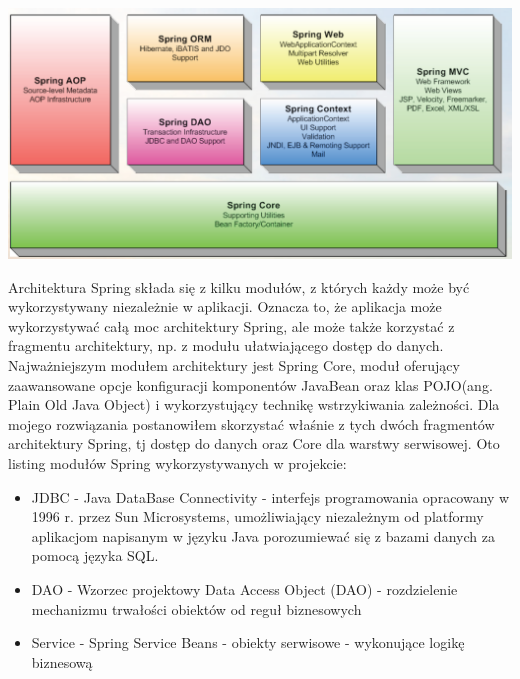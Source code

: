 \includegraphics[scale=0.31]{images/spring-modules}

Architektura Spring składa się z kilku modułów, z których każdy może być wykorzystywany niezależnie w aplikacji. Oznacza to, że aplikacja może wykorzystywać całą moc architektury Spring, ale może także korzystać z fragmentu architektury, np. z modułu ułatwiającego dostęp do danych. Najważniejszym modułem architektury jest Spring Core, moduł oferujący zaawansowane opcje konfiguracji komponentów JavaBean oraz klas POJO(ang. Plain Old Java Object) i wykorzystujący technikę wstrzykiwania zależności.
Dla mojego rozwiązania postanowiłem skorzystać właśnie z tych dwóch fragmentów architektury Spring, tj dostęp do danych oraz Core dla warstwy serwisowej. Oto listing modułów Spring wykorzystywanych w projekcie:
\begin{itemize}
 \item JDBC - Java DataBase Connectivity - interfejs programowania opracowany w 1996 r. przez Sun Microsystems, umożliwiający niezależnym od platformy aplikacjom napisanym w języku Java porozumiewać się z bazami danych za pomocą języka SQL.
 \item DAO - Wzorzec projektowy Data Access Object (DAO) - rozdzielenie mechanizmu trwałości obiektów od reguł biznesowych
 \item Service - Spring Service Beans - obiekty serwisowe - wykonujące logikę biznesową
\end{itemize}

